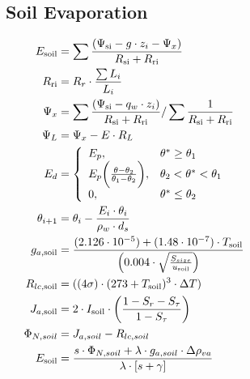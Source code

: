 \documentclass[10pt]{article}
\renewcommand{\marginnote}[2][]{}
\begin{document}

\subsection*{Soil Evaporation}

\begin{align}
 E_{\text{soil}} &= \sum \frac{(\Psi_{\text{si}} - g \cdot z_i - \Psi_x)}{R_{\text{si}}+R_{\text{ri}}} \label{eqn:Esoil} \\
 R_{\text{ri}} &= R_{r} \cdot \frac{\sum L_i}{L_i} \label{eqn:Rri} \\
 \Psi_x &= \sum \frac{(\Psi_{\text{si}}-q_w \cdot z_i)}{R_{\text{si}}+R_{\text{ri}}} / \sum \frac{1}{R_{\text{si}}+R_{\text{ri}}} \label{eqn:Psix} \\
 \Psi_L &= \Psi_x  - E \cdot R_L \hspace{3.2in} \label{eqn:PsiL}\\
 E_d &= \left\{ \begin{array}{ll}
        E_p , & \theta^{*} \geq \theta_1 \\
        E_p\biggl( \frac{\theta-\theta_2}{\theta_1 - \theta_2} \biggr), & \theta_2<\theta^*<\theta_1 \\
         0, & \theta^{*} \leq \theta_2 
                \end{array} \right. \label{eqn:Ed}\\
 \theta_{i+1} &= \theta_i - \frac{E_i \cdot \theta_i}{\rho_w \cdot d_s} \label{eqn:theta}\\
 g_{a,\text{soil}} &= \frac{(2.126 \cdot 10^{-5})+(1.48 \cdot 10^{-7}) \cdot T_{\text{soil}}}{\left(0.004 \cdot \sqrt{\frac{S_{size}}{u_{\text{soil}}}} \right)} \label{eqn:gasoil} \\
 R_{lc,\text{soil}} &= ((4 \sigma)\cdot(273 + T_{\text{soil}})^3 \cdot \Delta T) \label{eqn:Rlcsoil} \\
 J_{a,\text{soil}} &= 2 \cdot I_{\text{soil}} \cdot \biggl(\frac{1-S_r-S_{\tau}}{1-S_{\tau}}\biggr) \label{eqn:Jasoil} \\
 \Phi_{N,soil} &= J_{a,soil} - R_{lc,soil} \label{eqn:PhiNsoil} \\
 E_\text{soil} &= \frac{s \cdot \Phi_{N,soil} + \lambda \cdot g_{a,soil} \cdot \Delta \rho_{va}}{\lambda \cdot [s+\gamma]} \label{eqn:E2} \marginnote{is ``soil'' subscript correct?}
\end{align}
\end{document}
